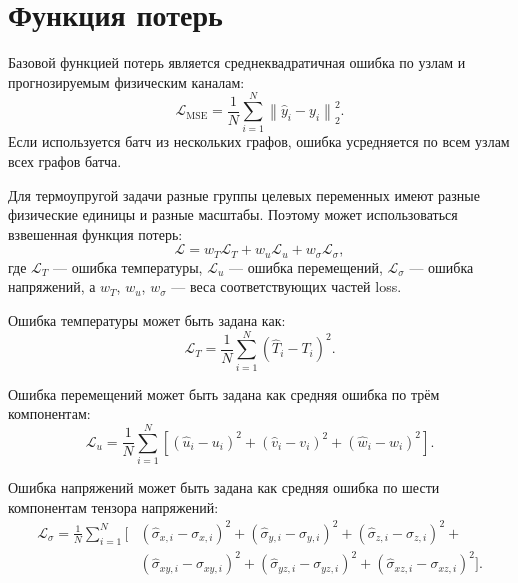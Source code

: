 \section{Функция потерь}

Базовой функцией потерь является среднеквадратичная ошибка по узлам и прогнозируемым физическим каналам:
\begin{equation}
    \mathcal{L}_{\mathrm{MSE}}=\frac{1}{N}\sum_{i=1}^{N}\left\|\hat{y}_i-y_i\right\|_2^2.
\end{equation}
Если используется батч из нескольких графов, ошибка усредняется по всем узлам всех графов батча.

Для термоупругой задачи разные группы целевых переменных имеют разные физические единицы и разные масштабы. Поэтому может использоваться взвешенная функция потерь:
\begin{equation}
    \mathcal{L}=w_T\mathcal{L}_T+w_u\mathcal{L}_u+w_{\sigma}\mathcal{L}_{\sigma},
\end{equation}
где $\mathcal{L}_T$ --- ошибка температуры, $\mathcal{L}_u$ --- ошибка перемещений, $\mathcal{L}_{\sigma}$ --- ошибка напряжений, а $w_T$, $w_u$, $w_{\sigma}$ --- веса соответствующих частей loss.

Ошибка температуры может быть задана как:
\begin{equation}
    \mathcal{L}_T=\frac{1}{N}\sum_{i=1}^{N}\left(\hat{T}_i-T_i\right)^2.
\end{equation}

Ошибка перемещений может быть задана как средняя ошибка по трём компонентам:
\begin{equation}
    \mathcal{L}_u=\frac{1}{N}\sum_{i=1}^{N}\left[\left(\hat{u}_i-u_i\right)^2+\left(\hat{v}_i-v_i\right)^2+\left(\hat{w}_i-w_i\right)^2\right].
\end{equation}

Ошибка напряжений может быть задана как средняя ошибка по шести компонентам тензора напряжений:
\begin{equation}
\begin{split}
    \mathcal{L}_{\sigma}=\frac{1}{N}\sum_{i=1}^{N}[&
    (\hat{\sigma}_{x,i}-\sigma_{x,i})^2+
    (\hat{\sigma}_{y,i}-\sigma_{y,i})^2+
    (\hat{\sigma}_{z,i}-\sigma_{z,i})^2+\\
    &(\hat{\sigma}_{xy,i}-\sigma_{xy,i})^2+
    (\hat{\sigma}_{yz,i}-\sigma_{yz,i})^2+
    (\hat{\sigma}_{xz,i}-\sigma_{xz,i})^2].
\end{split}
\end{equation}

